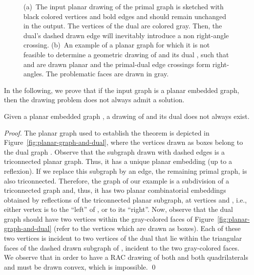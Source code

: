 \documentclass{llncs}
\begin{document}
\begin{figure}[t!hb]
  \centering
  \begin{minipage}[b]{.43\textwidth}
     \centering
  \end{minipage}
  \hfill
  \begin{minipage}[b]{.52\textwidth}
     \centering
  \end{minipage}
  \caption{(a)~The input planar drawing of the primal graph  is sketched with black colored vertices and bold edges and should remain
  unchanged in the output. The vertices of the dual  are colored gray. Then, the dual's dashed drawn edge will inevitably introduce a non right-angle crossing.
  (b)~An example of a planar graph  for which it is not feasible to determine a geometric drawing of  and its dual , such that  and 
are drawn planar and the primal-dual edge crossings form
right-angles. The problematic faces are drawn in gray.}
  \label{fig:ata-graph}
\end{figure}


In the following, we prove that if the input graph is a planar
embedded graph, then the  drawing problem does not always
admit a solution.

\begin{theorem}
\label{thm:planar-embedded}Given a planar embedded graph , a
 drawing of  and its dual  does not always exist.
\end{theorem}

\begin{proof}
The planar graph  used to establish the theorem is depicted in
Figure~\ref{fig:planar-graph-and-dual}, where the vertices drawn as
boxes belong to the dual graph . Observe that the subgraph
drawn with dashed edges is a triconnected planar graph. Thus, it has
a unique planar embedding (up to a reflexion). If we replace this
subgraph by an edge, the remaining primal graph, is also
triconnected. Therefore, the graph of our example is a subdivision
of a triconnected graph and, thus, it has two planar combinatorial
embeddings obtained by reflections of the triconnected planar
subgraph, at vertices  and , i.e., either vertex  is to
the ``left'' of , or to its ``right''. Now, observe that the
dual graph should have two vertices within the gray-colored faces of
Figure~\ref{fig:planar-graph-and-dual} (refer to the vertices which
are drawn as boxes). Each of these two vertices is incident to two
vertices of the dual that lie within the triangular faces of the
dashed drawn subgraph of , incident to the two gray-colored
faces. We observe that in order to have a RAC drawing of both 
and  both quadrilaterals  and  must be drawn
convex, which is impossible. \qed
\end{proof}
\end{document}

